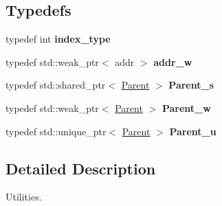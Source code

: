 \subsection*{\-Typedefs}
\begin{DoxyCompactItemize}
\item 
\hypertarget{namespaceNeb_1_1Actor_1_1Util_a22be593087f736e24fab42999719efa4}{typedef int {\bfseries index\-\_\-type}}\label{namespaceNeb_1_1Actor_1_1Util_a22be593087f736e24fab42999719efa4}

\item 
\hypertarget{namespaceNeb_1_1Actor_1_1Util_ac3d8a485cfe35818da67a8f674df7b97}{typedef std\-::weak\-\_\-ptr$<$ addr $>$ {\bfseries addr\-\_\-w}}\label{namespaceNeb_1_1Actor_1_1Util_ac3d8a485cfe35818da67a8f674df7b97}

\item 
\hypertarget{namespaceNeb_1_1Actor_1_1Util_afbe934c5a1a06c6550c444f3cbf28030}{typedef std\-::shared\-\_\-ptr$<$ \hyperlink{classNeb_1_1Actor_1_1Util_1_1Parent}{\-Parent} $>$ {\bfseries \-Parent\-\_\-s}}\label{namespaceNeb_1_1Actor_1_1Util_afbe934c5a1a06c6550c444f3cbf28030}

\item 
\hypertarget{namespaceNeb_1_1Actor_1_1Util_af4feac06a284dda47dfff353ec2d8954}{typedef std\-::weak\-\_\-ptr$<$ \hyperlink{classNeb_1_1Actor_1_1Util_1_1Parent}{\-Parent} $>$ {\bfseries \-Parent\-\_\-w}}\label{namespaceNeb_1_1Actor_1_1Util_af4feac06a284dda47dfff353ec2d8954}

\item 
\hypertarget{namespaceNeb_1_1Actor_1_1Util_aa630ce01b452da0c15c1f13deba9e3ed}{typedef std\-::unique\-\_\-ptr$<$ \hyperlink{classNeb_1_1Actor_1_1Util_1_1Parent}{\-Parent} $>$ {\bfseries \-Parent\-\_\-u}}\label{namespaceNeb_1_1Actor_1_1Util_aa630ce01b452da0c15c1f13deba9e3ed}

\end{DoxyCompactItemize}


\subsection{\-Detailed \-Description}
\-Utilities. 